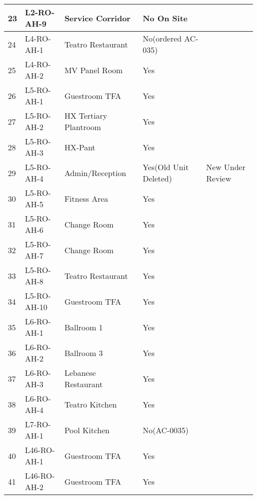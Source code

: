 \begin{table}[htbp]
\begin{tabular}{lll p{2cm}p{1.8cm}}
 23	 	 &L2-RO-AH-9	 &Service Corridor	 &No	 On Site	 &\ahutwo\\
\midrule
 24	 	 &L4-RO-AH-1	 &Teatro Restaurant	 &No(ordered	AC-035)	 &\ahufive\\
 25	 	 &L4-RO-AH-2	 &MV Panel Room	 &Yes	 	   &                                    \\
\midrule
 26	 	 &L5-RO-AH-1	 &Guestroom TFA	 &Yes	 	   &                                    \\
 27	 	 &L5-RO-AH-2	 &HX Tertiary Plantroom	 &Yes	 &	                                      \\
 28	 	 &L5-RO-AH-3	 &HX-Pant	 &Yes	 	               &                                   \\
 29	 	 &L5-RO-AH-4	 &Admin/Reception	&Yes(Old Unit Deleted) &  New Under Review	 \\
 30	 	 &L5-RO-AH-5	 &Fitness Area	 &Yes	 	 &\\
 31	 	 &L5-RO-AH-6	 &Change Room	&Yes	 	 &\\
 32	 	 &L5-RO-AH-7	 &Change Room    	      &Yes	 &\\	 
 33	 	 &L5-RO-AH-8	 &Teatro Restaurant	 &Yes	 &\\	 
 34	 	 &L5-RO-AH-10 & Guestroom TFA	 &Yes               &\\	 	 
\midrule
 35	 	 &L6-RO-AH-1	 &Ballroom 1	 &Yes	 	                     &\\
 36	 	 &L6-RO-AH-2	 &Ballroom 3	 &Yes	 	                     &\\
 37	 	 &L6-RO-AH-3	 &Lebanese Restaurant	 &Yes	 	         &\\
 38	 	 &L6-RO-AH-4	 &Teatro Kitchen	 &Yes	 	         &\\
\midrule
 39	 	 &L7-RO-AH-1	 &Pool Kitchen	 &No(AC-0035)          & \ahufive\\
\midrule
 40	 	 &L46-RO-AH-1 &Guestroom TFA	&Yes	 	 &\\
 41	 	 &L46-RO-AH-2 &Guestroom TFA	 &Yes	 	 &\\
\bottomrule
\end{tabular}

\end{table}


